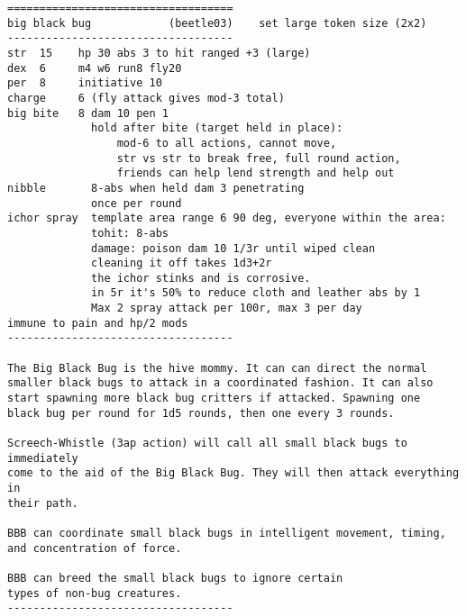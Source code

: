\goodbreak \begin{samepage} \small \begin{verbatim}
===================================
big black bug            (beetle03)    set large token size (2x2)
-----------------------------------
str  15    hp 30 abs 3 to hit ranged +3 (large)
dex  6     m4 w6 run8 fly20
per  8     initiative 10
charge     6 (fly attack gives mod-3 total)
big bite   8 dam 10 pen 1
             hold after bite (target held in place):
                 mod-6 to all actions, cannot move,
                 str vs str to break free, full round action,
                 friends can help lend strength and help out
nibble       8-abs when held dam 3 penetrating
             once per round
ichor spray  template area range 6 90 deg, everyone within the area:
             tohit: 8-abs
             damage: poison dam 10 1/3r until wiped clean
             cleaning it off takes 1d3+2r
             the ichor stinks and is corrosive.
             in 5r it's 50% to reduce cloth and leather abs by 1
             Max 2 spray attack per 100r, max 3 per day
immune to pain and hp/2 mods
-----------------------------------

The Big Black Bug is the hive mommy. It can can direct the normal
smaller black bugs to attack in a coordinated fashion. It can also
start spawning more black bug critters if attacked. Spawning one
black bug per round for 1d5 rounds, then one every 3 rounds.

Screech-Whistle (3ap action) will call all small black bugs to immediately 
come to the aid of the Big Black Bug. They will then attack everything in 
their path.

BBB can coordinate small black bugs in intelligent movement, timing,
and concentration of force.

BBB can breed the small black bugs to ignore certain
types of non-bug creatures.
-----------------------------------
\end{verbatim} \normalsize \end{samepage}

\

